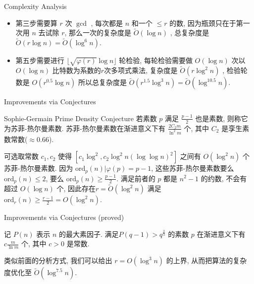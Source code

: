 \documentclass{beamer}
\def\le{\leqslant}
\def\ge{\geqslant}
\def\ord{\textrm{ord}}
\begin{document}
\begin{frame}{Complexity Analysis}
	\begin{itemize}
		\item 第三步需要算 $r$ 次 $\gcd$ , 每次都是 $n$ 和一个 $\le r$ 的数, 因为瓶颈只在于第一次用 $n$ 去试除 $r$, 那么一次的复杂度是 $\tilde O(\log n)$ , 总复杂度是 $\tilde O(r\log n) = \tilde O(\log^6n)$. \pause
		\item 第五步需要进行 $\lfloor\sqrt{\varphi(r)}\log n\rfloor$ 轮检验, 每轮检验需要做 $O(\log n)$ 次以 $O(\log n)$ 比特数为系数的$r$次多项式乘法, 复杂度是 $\tilde O(r\log^2n)$ , 检验轮数是 $O(r^{0.5}\log n)$ 所以总复杂度是 $\tilde O(r^{1.5}\log^{3} n) = \tilde O(\log^{10.5}n)$.
	\end{itemize}
\end{frame}
\begin{frame}{Improvements via Conjectures}
	\begin{block}{Sophie-Germain Prime Density Conjecture}
		若素数 $p$ 满足 $\frac{p-1}{2}$ 也是素数, 则称它为苏菲-热尔曼素数. 苏菲-热尔曼素数在渐进意义下有 $\frac{2C_2m}{\ln^2m}$ 个, 其中 $C_2$ 是孪生素数常数($\approx 0.66$).
	\end{block}

	可选取常数 $c_1, c_2$ 使得 $[c_1\log^2, c_2\log^2n(\log\log n)^2]$ 之间有 $O(\log^2n)$ 个苏菲-热尔曼素数. 因为 $\ord_p(n) | \varphi(p) = p - 1$, 这些苏菲-热尔曼素数要么 $\ord_{p}(n) \le 2$, 要么 $\ord_p(n) \ge \frac{p-1}{2}$. 满足前者的 $p$ 都是 $n^2 - 1$ 的约数, 不会有超过 $O(\log n)$ 个, 因此存在$r = \tilde O(\log^2n)$ 满足 $\ord_r(n) \ge \frac{r-1}{2} = O(\log^2n)$.
\end{frame}
\begin{frame}{Improvements via Conjectures (proved)}
	\begin{lemma}
		记 $P(n)$ 表示 $n$ 的最大素因子. 满足$P(q - 1) > q^{\frac23}$ 的素数 $p$ 在渐进意义下有 $c\frac{m}{\ln m}$ 个, 其中 $c > 0$ 是常数.
	\end{lemma}

	类似前面的分析方式, 我们可以给出 $r = O(\log^3n)$ 的上界, 从而把算法的复杂度优化至 $\tilde O(\log^{7.5}n)$.
\end{frame}
\end{document}
